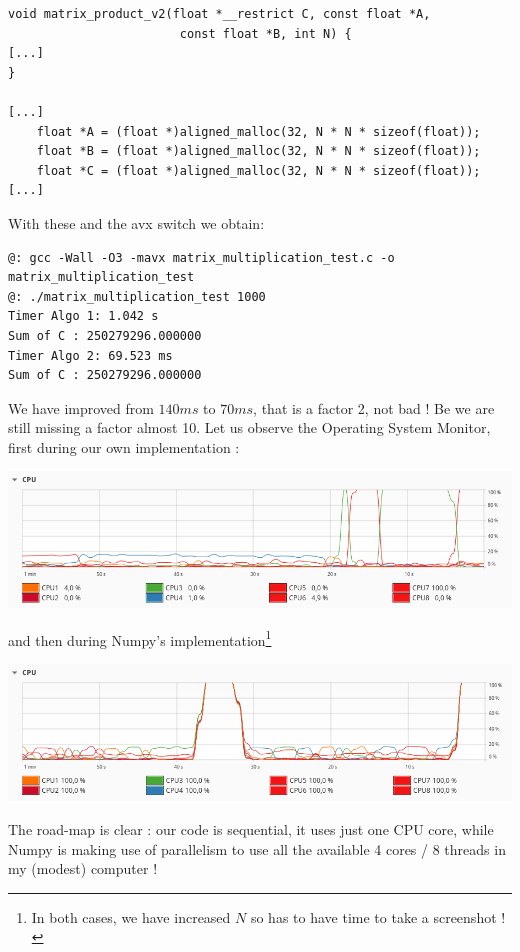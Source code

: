 \documentclass[12pt]{article}
\theoremstyle{plain}
\theoremstyle{remark}
\begin{document}
\begin{lstlisting}[style=C]
void matrix_product_v2(float *__restrict C, const float *A, 
						const float *B, int N) {
[...]
}

[...]
	float *A = (float *)aligned_malloc(32, N * N * sizeof(float));
	float *B = (float *)aligned_malloc(32, N * N * sizeof(float));
	float *C = (float *)aligned_malloc(32, N * N * sizeof(float));
[...]
\end{lstlisting}
With these and the avx switch we obtain:
\begin{lstlisting}[style=bash]
@: gcc -Wall -O3 -mavx matrix_multiplication_test.c -o matrix_multiplication_test
@: ./matrix_multiplication_test 1000
Timer Algo 1: 1.042 s
Sum of C : 250279296.000000
Timer Algo 2: 69.523 ms
Sum of C : 250279296.000000
\end{lstlisting}
We have improved from $140ms$ to $70ms$, that is a factor 2, not bad ! Be we
are still missing a factor almost 10. Let us observe the Operating System 
Monitor, first during our own implementation : 
\begin{center}
\includegraphics[width=15cm]{data/mat_mult_one_core.png}
\end{center}
and then during Numpy's implementation\footnote{In both cases, we have increased
$N$ so has to have time to take a screenshot !} 
\begin{center}
\includegraphics[width=15cm]{data/mat_mult_all_core.png}
\end{center}

The road-map is clear : our code is sequential, it uses just one CPU core, while
Numpy is making use of parallelism to use all the available 4 cores / 8 threads
in my (modest) computer ! 

\medskip
\end{document}
